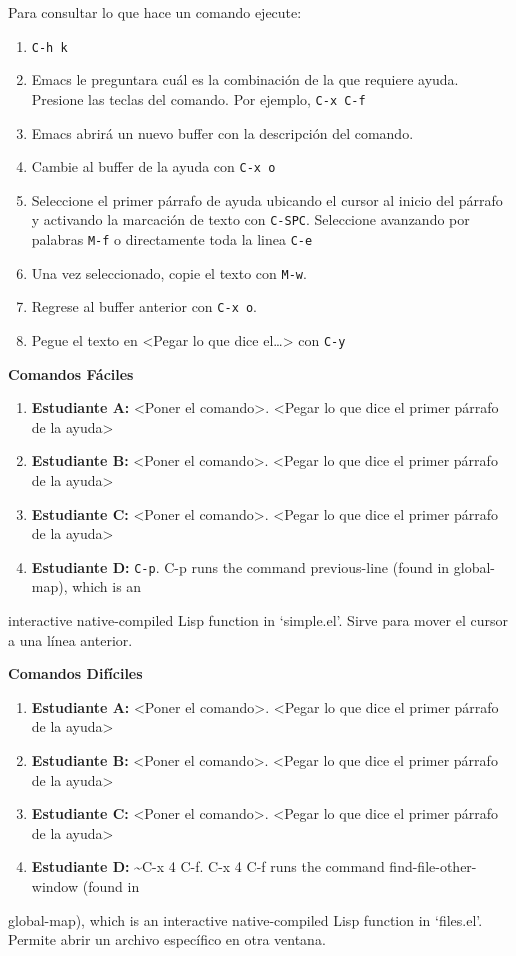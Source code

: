\documentclass{article}
\begin{document}
Para consultar lo que hace un comando ejecute:
\begin{enumerate}
\item \texttt{C-h k}
\item Emacs le preguntara cuál es la combinación de la que requiere
ayuda. Presione las teclas del comando. Por ejemplo, \texttt{C-x C-f}
\item Emacs abrirá un nuevo buffer con la descripción del comando.
\item Cambie al buffer de la ayuda con \texttt{C-x o}
\item Seleccione el primer párrafo de ayuda ubicando el cursor al inicio
del párrafo y activando la marcación de texto con
\texttt{C-SPC}. Seleccione avanzando por palabras \texttt{M-f} o directamente
toda la linea \texttt{C-e}
\item Una vez seleccionado, copie el texto con \texttt{M-w}.
\item Regrese al buffer anterior con \texttt{C-x o}.
\item Pegue el texto en <Pegar lo que dice el\ldots{}> con \texttt{C-y}
\end{enumerate}

\textbf{\textbf{Comandos Fáciles}}
\begin{enumerate}
\item \textbf{\textbf{Estudiante A:}} <Poner el comando>. <Pegar lo que dice el primer párrafo de la ayuda>
\item \textbf{\textbf{Estudiante B:}} <Poner el comando>. <Pegar lo que dice el primer párrafo de la ayuda>
\item \textbf{\textbf{Estudiante C:}} <Poner el comando>. <Pegar lo que dice el primer párrafo de la ayuda>
\item \textbf{\textbf{Estudiante D:}} \texttt{C-p}. C-p runs the command previous-line (found in global-map), which is an
\end{enumerate}
interactive native-compiled Lisp function in ‘simple.el’. Sirve para mover el cursor a una línea anterior.

\textbf{\textbf{Comandos Difíciles}}
\begin{enumerate}
\item \textbf{\textbf{Estudiante A:}} <Poner el comando>. <Pegar lo que dice el primer párrafo de la ayuda>
\item \textbf{\textbf{Estudiante B:}} <Poner el comando>. <Pegar lo que dice el primer párrafo de la ayuda>
\item \textbf{\textbf{Estudiante C:}} <Poner el comando>. <Pegar lo que dice el primer párrafo de la ayuda>
\item \textbf{\textbf{Estudiante D:}} \textasciitilde{}C-x 4 C-f. C-x 4 C-f runs the command find-file-other-window (found in
\end{enumerate}
global-map), which is an interactive native-compiled Lisp function in
‘files.el’. Permite abrir un archivo específico en otra ventana.
\end{document}
